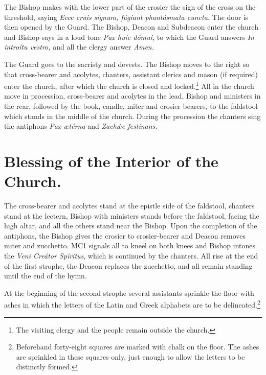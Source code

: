 \documentclass[letterpaper]{report}
\begin{document}
{    \rubric The Bishop makes with the lower part of the crosier the sign of the
    cross on the threshold, saying \textit{Ecce cru\cross is signum, f\'ugiant
    phant\'asmata cuncta.} The door is then opened by the Guard. The Bishop,
    Deacon and Subdeacon enter the church and Bishop says in a loud tone
    \textit{Pax huic d\'omui,} to which the Guard answers \textit{In introítu
    vestro,} and all the clergy answer \textit{Amen.}

    \rubric The Guard goes to the sacristy and devests. The Bishop moves to the
    right so that cross-bearer and acolytes, chanters, assistant clerics and
    mason (if required) enter the church, after which the church is closed and
    locked.\footnote{The visiting clergy and the people remain outside the
    church.} All in the church move in procession, cross-bearer and acolytes in
    the lead, Bishop and ministers in the rear, followed by the book, candle,
    miter and crosier bearers, to the faldstool which stands in the middle of
    the church. During the procession the chanters sing the antiphons
    \textit{Pax \ae t\'erna} and \textit{Zach\'\ae e fest\'inans.}

    \section{Blessing of the Interior of the Church.}

    \rubric The cross-bearer and acolytes stand at the epistle side of the
    faldstool, chanters stand at the lectern, Bishop with ministers stands
    before the faldstool, facing the high altar, and all the others stand near
    the Bishop. Upon the completion of the antiphons, the Bishop gives the
    crosier to crosier-bearer and Deacon removes miter and zucchetto. MC1
    signals all to kneel on both knees and Bishop intones the \textit{Veni
    Cre\'ator Sp\'iritus}, which is continued by the chanters. All rise at the
    end of the first strophe, the Deacon replaces the zucchetto, and all remain
    standing until the end of the hymn.

    \rubric At the beginning of the second strophe several assistants sprinkle
    the floor with ashes in which the letters of the Latin and Greek alphabets
    are to be delineated.\footnote{Beforehand forty-eight squares are marked
    with chalk on the floor. The ashes are sprinkled in these squares only,
    just enough to allow the letters to be distinctly formed.}

}
\end{document}
